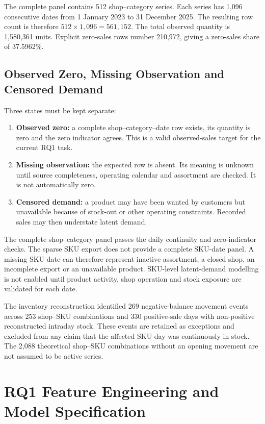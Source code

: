 \documentclass[a4paper,11pt,oneside]{book}
\theoremstyle{plain}
\theoremstyle{definition}
\theoremstyle{remark}
\begin{document}
The complete panel contains 512 shop--category series. Each series has
1,096 consecutive dates from 1 January 2023 to 31 December 2025. The
resulting row count is therefore \(512\times1{,}096=561{,}152\).
The total observed quantity is 1,580,361 units. Explicit zero-sales rows
number 210,972, giving a zero-sales share of 37.5962\%.

\section{Observed Zero, Missing Observation and Censored Demand}

Three states must be kept separate:

\begin{enumerate}
\item \textbf{Observed zero:} a complete shop--category--date row exists,
its quantity is zero and the zero indicator agrees. This is a valid
observed-sales target for the current RQ1 task.
\item \textbf{Missing observation:} the expected row is absent. Its meaning
is unknown until source completeness, operating calendar and assortment
are checked. It is not automatically zero.
\item \textbf{Censored demand:} a product may have been wanted by customers
but unavailable because of stock-out or other operating constraints.
Recorded sales may then understate latent demand.
\end{enumerate}

The complete shop--category panel passes the daily continuity and
zero-indicator checks. The sparse SKU export does not provide a complete
SKU-date panel. A missing SKU date can therefore represent inactive
assortment, a closed shop, an incomplete export or an unavailable product.
SKU-level latent-demand modelling is not enabled until product activity,
shop operation and stock exposure are validated for each date.

The inventory reconstruction identified 269 negative-balance movement
events across 253 shop--SKU combinations and 330 positive-sale days with
non-positive reconstructed intraday stock. These events are retained as
exceptions and excluded from any claim that the affected SKU-day was
continuously in stock. The 2,088 theoretical shop--SKU combinations
without an opening movement are not assumed to be active series.

\chapter{RQ1 Feature Engineering and Model Specification}
\label{appendix:rq1_model_specification}
\end{document}
